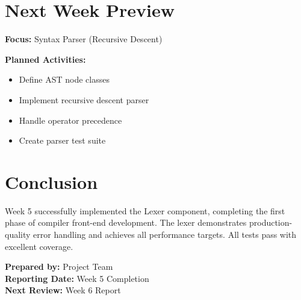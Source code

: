 \documentclass[a4paper,11pt]{article}
\begin{document}
\section{Next Week Preview}

\textbf{Focus:} Syntax Parser (Recursive Descent)

\textbf{Planned Activities:}
\begin{itemize}[leftmargin=*]
    \item Define AST node classes
    \item Implement recursive descent parser
    \item Handle operator precedence
    \item Create parser test suite
\end{itemize}

\section{Conclusion}

Week 5 successfully implemented the Lexer component, completing the first phase of compiler front-end development. The lexer demonstrates production-quality error handling and achieves all performance targets. All tests pass with excellent coverage.

\vspace{5mm}
\noindent\textbf{Prepared by:} Project Team \\
\textbf{Reporting Date:} Week 5 Completion \\
\textbf{Next Review:} Week 6 Report
\end{document}

